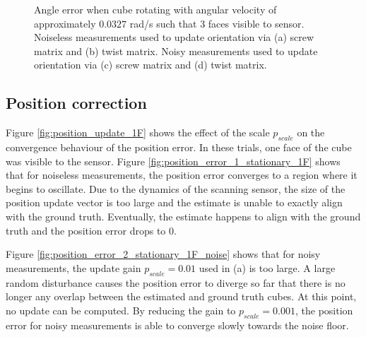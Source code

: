 \begin{figure}[h]
{\begin{minipage}[b]{0.45\columnwidth}
 	\end{minipage}}
 	\caption{Angle error when cube rotating with angular velocity of approximately $0.0327$ rad/s such that 3 faces visible to sensor. Noiseless measurements used to update orientation via (a) screw matrix and (b) twist matrix. Noisy measurements used to update orientation via (c) screw matrix and (d) twist matrix.}
 	\label{fig:angle_error_rotating}
\end{figure}

\subsection{Position correction}
Figure \ref{fig:position_update_1F} shows the effect of the scale $p_{scale}$ on the convergence behaviour of the position error. In these trials, one face of the cube was visible to the sensor. Figure \ref{fig:position_error_1_stationary_1F} shows that for noiseless measurements, the position error converges to a region where it begins to oscillate. Due to the dynamics of the scanning sensor, the size of the position update vector is too large and the estimate is unable to exactly align with the ground truth. Eventually, the estimate happens to align with the ground truth and the position error drops to 0.

Figure \ref{fig:position_error_2_stationary_1F_noise} shows that for noisy measurements, the update gain $p_{scale} = 0.01$ used in (a) is too large. A large random disturbance causes the position error to diverge so far that there is no longer any overlap between the estimated and ground truth cubes. At this point, no update can be computed.
By reducing the gain to $p_{scale} = 0.001$, the position error for noisy measurements is able to converge slowly towards the noise floor.

